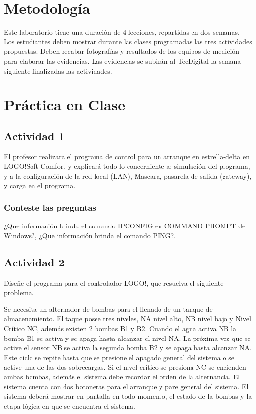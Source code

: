  
\section{Metodología}

Este laboratorio tiene una duración de 4 lecciones, repartidas en dos semanas. Los estudiantes deben mostrar durante las clases programadas las tres actividades propuestas. Deben recabar fotografías y resultados de los equipos de medición para elaborar las evidencias. Las evidencias se subirán al TecDigital la semana siguiente finalizadas las actividades.

\section{Práctica en Clase}

\subsection{Actividad 1}

	El profesor realizara el programa de control para un arranque en estrella-delta en LOGO!Soft Comfort y explicará todo lo concerniente a: simulación del programa, y a la configuración de la red local (LAN), Mascara, pasarela de salida (gateway), y carga en el programa. 
	
 \subsubsection{Conteste las preguntas}
 	¿Que información brinda el comando IPCONFIG en COMMAND PROMPT de Windows?, ¿Que información brinda el comando PING?.  

\subsection{Actividad 2}


Diseñe el programa para el controlador LOGO!, que resuelva el siguiente problema.

Se necesita un alternador de bombas  para el llenado de un tanque de almacenamiento. El taque posee tres niveles, NA nivel alto, NB nivel bajo y Nivel Crítico NC, además existen 2 bombas B1 y B2. Cuando el agua activa NB la bomba B1 se activa y se apaga hasta alcanzar el nivel NA. La próxima vez que se active el sensor NB se activa la segunda bomba B2 y se apaga hasta alcanzar NA. Este ciclo se repite hasta que se presione el apagado general del sistema o se active una de las dos sobrecargas. Si el nivel crítico se presiona NC se encienden ambas bombas, además el sistema debe  recordar el orden de la alternancia. El sistema cuenta con dos botoneras para el arranque y pare general del sistema. El sistema deberá mostrar en pantalla en todo momento,  el estado de la bombas y la etapa lógica en que se encuentra el sistema.

